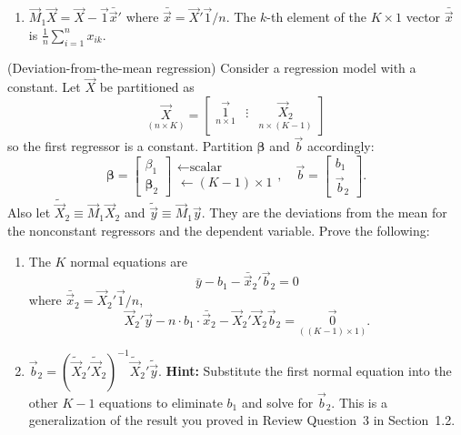 \begin{problemset}
\begin{enumerate}[label=(\alph*)]
\item $\vec{M}_1 \vec{X} = \vec{X} - \vec{1}\bar{\vec{x}}'$ where
$\bar{\vec{x}} = \vec{X}'\vec{1}/n$. The $k$-th element of the
$K \times 1$ vector $\bar{\vec{x}}$ is
$\frac{1}{n}\sum_{i=1}^{n} x_{ik}$.
\end{enumerate}

\exercise[3] (Deviation-from-the-mean regression)\quad
Consider a regression model with a constant. Let $\vec{X}$ be partitioned as
%
\[
\underset{(n \times K)}{\vec{X}}
= \begin{bmatrix}
\underset{n \times 1}{\vec{1}} & \vdots & \underset{n \times (K-1)}{\vec{X}_2}
\end{bmatrix}
\]
%
so the first regressor is a constant. Partition $\bm{\beta}$ and $\vec{b}$ accordingly:
%
\[
\bm{\beta} = \begin{bmatrix} \beta_1 \\ \bm{\beta}_2 \end{bmatrix}
\begin{array}{l} \leftarrow \text{scalar} \\ \leftarrow (K-1) \times 1 \end{array}, \quad
\vec{b} = \begin{bmatrix} b_1 \\ \vec{b}_2 \end{bmatrix}.
\]
%
Also let $\widetilde{\vec{X}}_2 \equiv \vec{M}_1 \vec{X}_2$ and
$\tilde{\vec{y}} \equiv \vec{M}_1 \vec{y}$. They are the deviations from the mean for
the nonconstant regressors and the dependent variable. Prove the following:

\begin{enumerate}[label=(\alph*)]
\item The $K$ normal equations are
%
\[
\bar{y} - b_1 - \bar{\vec{x}}_2'\vec{b}_2 = 0
\]
%
where $\bar{\vec{x}}_2 = \vec{X}_2'\vec{1}/n$,
%
\[
\vec{X}_2'\vec{y} - n \cdot b_1 \cdot \bar{\vec{x}}_2
- \vec{X}_2'\vec{X}_2 \vec{b}_2
= \underset{((K-1)\times 1)}{\vec{0}}.
\]

\item $\vec{b}_2 = (\widetilde{\vec{X}}_2'\widetilde{\vec{X}}_2)^{-1}
\widetilde{\vec{X}}_2'\tilde{\vec{y}}$.
\textbf{Hint:} Substitute the first normal equation into the other
$K - 1$ equations to eliminate $b_1$ and solve for $\vec{b}_2$.
This is a generalization of the result you proved in Review Question~3
in Section~1.2.
\end{enumerate}


\end{problemset}
